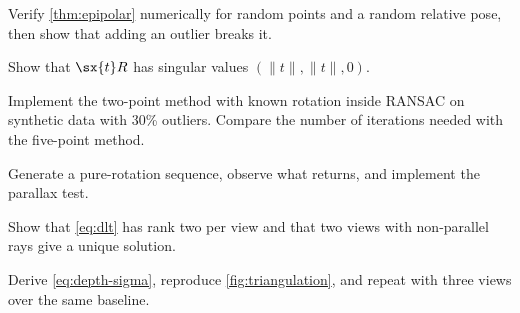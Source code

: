 \begin{exercises}
  \item Verify \cref{thm:epipolar} numerically for random points and a random relative pose, then show that adding an
        outlier breaks it.
  \item Show that $\sx{t}R$ has singular values $(\|t\|, \|t\|, 0)$.
  \item Implement the two-point method with known rotation inside RANSAC on synthetic data with 30\% outliers. Compare the
        number of iterations needed with the five-point method.
  \item Generate a pure-rotation sequence, observe what  returns, and implement the parallax test.
  \item Show that \eqref{eq:dlt} has rank two per view and that two views with non-parallel rays give a unique solution.
  \item Derive \eqref{eq:depth-sigma}, reproduce \cref{fig:triangulation}, and repeat with three views over the same baseline.
\end{exercises}
